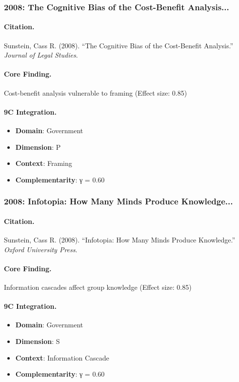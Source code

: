 \subsubsection{2008: The Cognitive Bias of the Cost-Benefit Analysis...}

\paragraph{Citation.}
Sunstein, Cass R. (2008). ``The Cognitive Bias of the Cost-Benefit Analysis.''
\textit{Journal of Legal Studies}.

\paragraph{Core Finding.}
Cost-benefit analysis vulnerable to framing (Effect size: 0.85)

\paragraph{9C Integration.}
\begin{itemize}[nosep]
  \item \textbf{Domain}: Government
  \item \textbf{Dimension}: P
  \item \textbf{Context}: Framing
  \item \textbf{Complementarity}: γ = 0.60
\end{itemize}

\subsubsection{2008: Infotopia: How Many Minds Produce Knowledge...}

\paragraph{Citation.}
Sunstein, Cass R. (2008). ``Infotopia: How Many Minds Produce Knowledge.''
\textit{Oxford University Press}.

\paragraph{Core Finding.}
Information cascades affect group knowledge (Effect size: 0.85)

\paragraph{9C Integration.}
\begin{itemize}[nosep]
  \item \textbf{Domain}: Government
  \item \textbf{Dimension}: S
  \item \textbf{Context}: Information Cascade
  \item \textbf{Complementarity}: γ = 0.60
\end{itemize}

